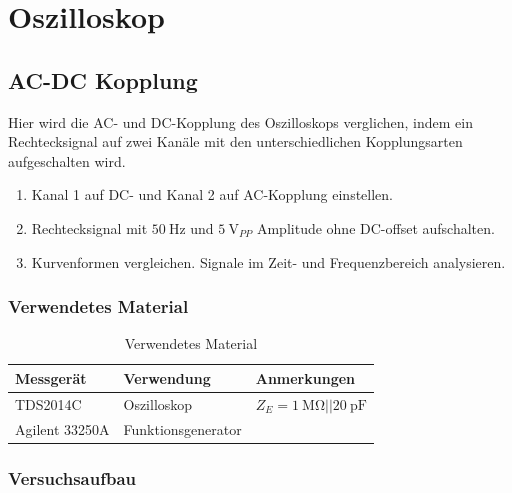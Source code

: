 \section{Oszilloskop}\label{sec:2}
\subsection{AC-DC Kopplung}\label{sec:2-1}

\begin{highlightblock}
	Hier wird die AC- und DC-Kopplung des Oszilloskops verglichen, indem ein Rechtecksignal
	auf zwei Kanäle mit den unterschiedlichen Kopplungsarten aufgeschalten wird.
	\begin{enumerate}[label=\textbf{\alph*:}, ref=\alph*, noitemsep]
		\item\label{itm:2-P1-1} Kanal 1 auf DC- und Kanal 2 auf AC-Kopplung einstellen.
		\item\label{itm:2-P1-2} Rechtecksignal mit $\SI{50}{\hertz}$ und $\SI{5}{\volt}_{PP}$ Amplitude ohne DC-offset aufschalten.
		\item\label{itm:2-P1-3} Kurvenformen vergleichen. Signale im Zeit- und Frequenzbereich analysieren.
	\end{enumerate}

\end{highlightblock}

\subsubsection{Verwendetes Material}

\begin{table}[h]
	\centering
	\caption{Verwendetes Material}
	\begin{tabularx}{\textwidth}{XXX}
		\textbf{Messgerät} & \textbf{Verwendung} & \textbf{Anmerkungen}                            \\ \midrule
		TDS2014C           & Oszilloskop         & $Z_E = \SI{1}{\mega\ohm}||\SI{20}{\pico\farad}$ \\
		Agilent 33250A     & Funktionsgenerator  &                                                 \\
	\end{tabularx}
\end{table}

\subsubsection{Versuchsaufbau}

